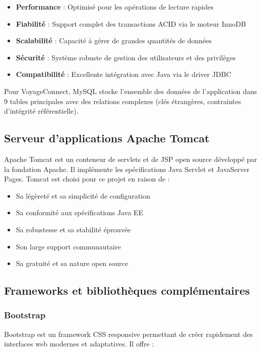 \documentclass[12pt,a4paper]{report}
\begin{document}
\begin{itemize}
    \item \textbf{Performance} : Optimisé pour les opérations de lecture rapides
    \item \textbf{Fiabilité} : Support complet des transactions ACID via le moteur InnoDB
    \item \textbf{Scalabilité} : Capacité à gérer de grandes quantités de données
    \item \textbf{Sécurité} : Système robuste de gestion des utilisateurs et des privilèges
    \item \textbf{Compatibilité} : Excellente intégration avec Java via le driver JDBC
\end{itemize}

Pour VoyageConnect, MySQL stocke l'ensemble des données de l'application dans 9 tables principales avec des relations complexes (clés étrangères, contraintes d'intégrité référentielle).

\subsection{Serveur d'applications Apache Tomcat}

Apache Tomcat est un conteneur de servlets et de JSP open source développé par la fondation Apache. Il implémente les spécifications Java Servlet et JavaServer Pages. Tomcat est choisi pour ce projet en raison de :

\begin{itemize}
    \item Sa légèreté et sa simplicité de configuration
    \item Sa conformité aux spécifications Java EE
    \item Sa robustesse et sa stabilité éprouvée
    \item Son large support communautaire
    \item Sa gratuité et sa nature open source
\end{itemize}

\subsection{Frameworks et bibliothèques complémentaires}

\subsubsection{Bootstrap}

Bootstrap est un framework CSS responsive permettant de créer rapidement des interfaces web modernes et adaptatives. Il offre :
\end{document}
